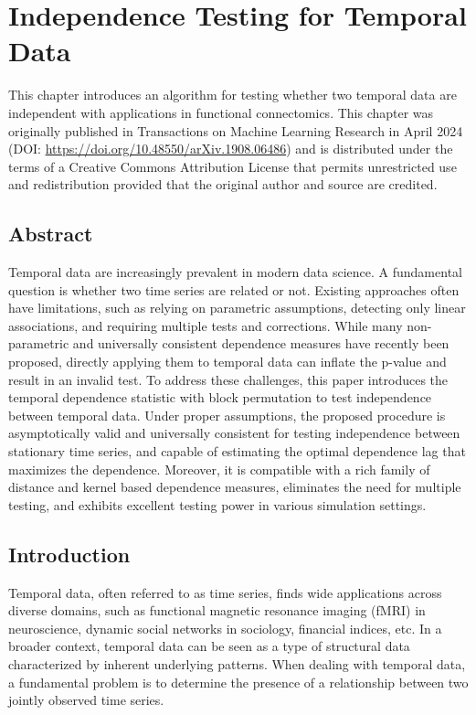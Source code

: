 \chapter{Independence Testing for Temporal Data} \label{chap:mgcx}

This chapter introduces an algorithm for testing whether two temporal data are independent with applications in functional connectomics. This chapter was originally published in Transactions on Machine Learning Research in April 2024 (DOI: \url{https://doi.org/10.48550/arXiv.1908.06486}) and is distributed under the terms of a Creative Commons Attribution License that permits unrestricted use and redistribution provided that the original author and source are credited.

\pagebreak 
\section*{Abstract}
Temporal data are increasingly prevalent in modern data science. A fundamental question is whether two time series are related or not. Existing approaches often have limitations, such as relying on parametric assumptions, detecting only linear associations, and requiring multiple tests and corrections. While many non-parametric and universally consistent dependence measures have recently been proposed, directly applying them to temporal data can inflate the p-value and result in an invalid test. To address these challenges, this paper introduces the temporal dependence statistic with block permutation to test independence between temporal data. Under proper assumptions, the proposed procedure is asymptotically valid and universally consistent for testing independence between stationary time series, and capable of estimating the optimal dependence lag that maximizes the dependence. Moreover, it is compatible with a rich family of distance and kernel based dependence measures, eliminates the need for multiple testing, and exhibits excellent testing power in various simulation settings.
\pagebreak

\section{Introduction}\label{sec:intro}
Temporal data, often referred to as time series, finds wide applications across diverse domains, such as functional magnetic resonance imaging (fMRI) in neuroscience, dynamic social networks in sociology, financial indices, etc. In a broader context, temporal data can be seen as a type of structural data characterized by inherent underlying patterns. When dealing with temporal data, a fundamental problem is to determine the presence of a relationship between two jointly observed time series. 

